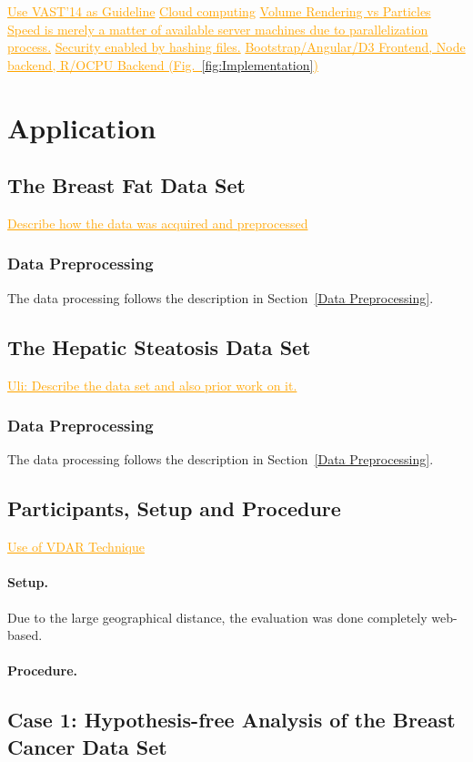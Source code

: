 \documentclass[journal]{style/vgtc} 			          %
\newcommand{\com}[1]{\textcolor{orange}{\uline{#1}}}
\begin{document}
\com{Use VAST'14 as Guideline}
\com{Cloud computing}
\com{Volume Rendering vs Particles}
\com{Speed is merely a matter of available server machines due to parallelization process.}
\com{Security enabled by hashing files.}
\com{Bootstrap/Angular/D3 Frontend, Node backend, R/OCPU Backend (Fig.~\ref{fig:Implementation})}

\section{Application} \label{application}
%
\subsection{The Breast Fat Data Set}
\com{Describe how the data was acquired and preprocessed}

\subsubsection{Data Preprocessing} \label{application:Data Preprocessing}
The data processing follows the description in Section~\ref{Data Preprocessing}.
%

\subsection{The Hepatic Steatosis Data Set}
\com{Uli: Describe the data set and also prior work on it.}

\subsubsection{Data Preprocessing} \label{application:Data Preprocessing}
The data processing follows the description in Section~\ref{Data Preprocessing}.
%

\subsection{Participants, Setup and Procedure}
\com{Use of VDAR Technique}
%
\paragraph{Setup.} Due to the large geographical distance, the evaluation was done completely web-based.
\paragraph{Procedure.}
\subsection{Case 1: Hypothesis-free Analysis of the Breast Cancer Data Set}
\end{document}
